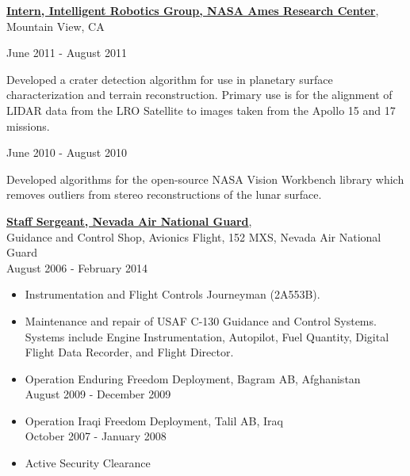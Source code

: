\documentclass[10pt]{article}
\newenvironment{outerlist}[1][\enskip\textbullet]%
        {\begin{itemize}[#1]}{\end{itemize}%
         \vspace{-.6\baselineskip}}
\newenvironment{innerlist}[1][\enskip\textbullet]%
        {\begin{compactitem}[#1]}{\end{compactitem}}
\begin{document}
\href{http://ti.arc.nasa.gov/tech/asr/intelligent-robotics/}
     {\textbf{Intern, Intelligent Robotics Group, NASA Ames Research Center}},\\
      Mountain View, CA \hspace{48mm}
      
      \begin{outerlist}
      \item June 2011 - August 2011
         \begin{innerlist}
         \item[] Developed a crater detection algorithm for use in planetary
               surface characterization and terrain reconstruction. Primary use
               is for the alignment of LIDAR data from the LRO Satellite
               to images taken from the Apollo 15 and 17 missions.
         \end{innerlist}
      
      \item June 2010 - August 2010
      \begin{innerlist}
      \item[] Developed algorithms for the open-source NASA Vision Workbench library
            which removes outliers from stereo reconstructions of the lunar surface.\\
      \end{innerlist}
      \end{outerlist}
\href{http://www.nv.ngb.army.mil/air/index.cfm}
     {\textbf{Staff Sergeant, Nevada Air National Guard}},\\
     Guidance and Control Shop, Avionics Flight, 152 MXS, Nevada Air National Guard\\
     August 2006 - February 2014
     \begin{outerlist}
     \item Instrumentation and Flight Controls Journeyman (2A553B).
     \item Maintenance and repair of USAF C-130 Guidance and Control Systems. Systems
           include Engine Instrumentation, Autopilot, Fuel Quantity,
           Digital Flight Data Recorder, and Flight Director.
     \item Operation Enduring Freedom Deployment, Bagram AB, Afghanistan\\     
           August 2009 - December 2009
     \item Operation Iraqi Freedom Deployment, Talil AB, Iraq\\               
           October 2007 - January 2008
     \item Active Security Clearance\\
     \end{outerlist}
\end{document}
